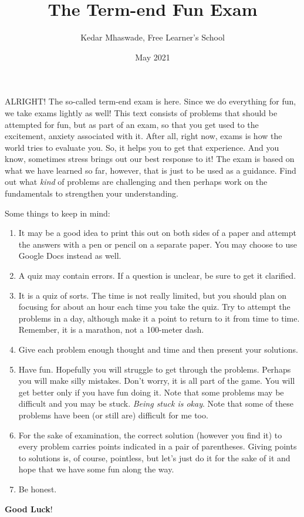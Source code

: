 \documentclass[12pt]{exam}         %
\title{The Term-end Fun Exam}
\author{Kedar Mhaswade, Free Learner's School}
\date{May 2021}
\begin{document}
\maketitle

\lettrine[lines=3]{A}{LRIGHT}! The so-called term-end exam is here. Since we do everything for fun, we take exams lightly as well!  This text consists of problems that should be attempted for fun, but as part of an exam, so that you get used to the excitement, anxiety associated with it. After all, right now, exams is how the world tries to evaluate you. So, it helps you to get that experience. And you know, sometimes stress brings out our best response to it! 
The exam is based on what we have learned so far, however, that is just to be used as a guidance. Find out what \emph{kind} of problems are challenging and then perhaps work on the fundamentals to strengthen your understanding.


Some things to keep in mind:
\begin{enumerate}
\item It may be a good idea to print this out on both sides of a paper and attempt the answers with a pen or pencil on a separate paper. You may choose to use Google Docs instead as well. 
\item A quiz may contain errors. If a question is unclear, be sure to get it clarified.
\item It is a quiz of sorts. The time is not really limited, but you should plan on focusing for about an hour each time you take the quiz. Try to attempt the problems in a day, although make it a point to return to it from time to time. Remember, it is a marathon, not a 100-meter dash.
\item Give each problem enough thought and time and then present your solutions.
\item Have fun. Hopefully you will struggle to get through the problems. Perhaps you will make silly mistakes. Don't worry, it is all part of the game. You will get better only if you have fun doing it. Note that some problems may be difficult and you may be stuck. \emph{Being stuck is okay}. Note that some of these problems have been (or still are) difficult for me too.
\item For the sake of examination, the correct solution (however you find it) to every problem carries points indicated in a pair of parentheses. Giving points to solutions is, of course, pointless, but let's just do it for the sake of it and hope that we have some fun along the way. 
\item Be honest.
\end{enumerate}
\textbf{Good Luck}!
\end{document}
